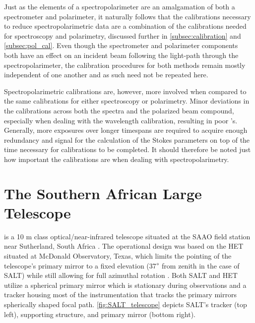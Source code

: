 Just as the elements of a spectropolarimeter are an amalgamation of both a spectrometer and polarimeter, it naturally follows that the calibrations necessary to reduce spectropolarimetric data are a combination of the calibrations needed for spectroscopy and polarimetry, discussed further in \autoref{subsec:calibration} and \autoref{subsec:pol_cal}. Even though the spectrometer and polarimeter components both have an effect on an incident beam following the light-path through the spectropolarimeter, the calibration procedures for both methods remain mostly independent of one another and as such need not be repeated here.

Spectropolarimetric calibrations are, however, more involved when compared to the same calibrations for either spectroscopy or polarimetry. Minor deviations in the calibrations across both the spectra and the polarized beam compound, especially when dealing with the wavelength calibration, resulting in poor 's. Generally, more exposures over longer timespans are required to acquire enough redundancy and signal for the calculation of the Stokes parameters on top of the time necessary for calibrations to be completed. It should therefore be noted just how important the calibrations are when dealing with spectropolarimetry.

\section{The Southern African Large Telescope} \label{sec:SALT} %

 is a 10 m class optical/near-infrared telescope situated at the \gls{SAAO} field station near Sutherland, South Africa \citep{SALT_optical_design}. The operational design was based on the \gls{HET} situated at McDonald Observatory, Texas, which limits the pointing of the telescope's primary mirror to a fixed elevation (37$\degree$ from zenith in the case of SALT) while still allowing for full azimuthal rotation \citep{HET}. Both SALT and HET utilize a spherical primary mirror which is stationary during observations and a tracker housing most of the instrumentation that tracks the primary mirrors spherically shaped focal path. \autoref{fig:SALT_telescope} depicts \gls{SALT}'s tracker (top left), supporting structure, and primary mirror (bottom right).


